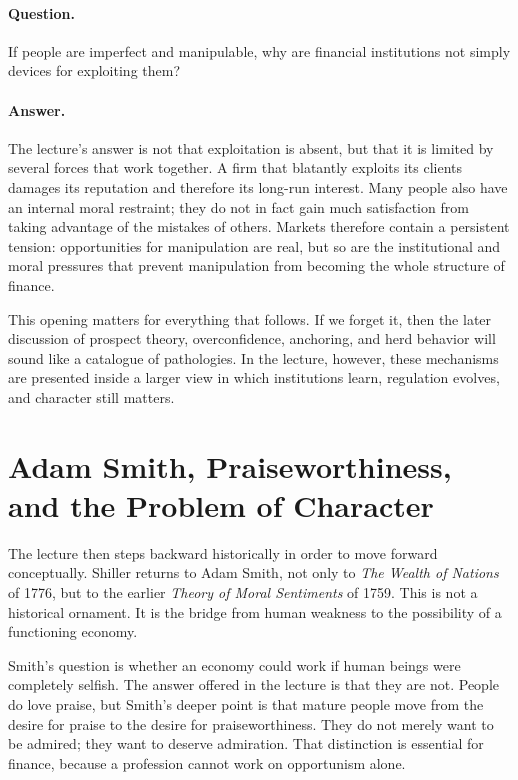 \paragraph{Question.} If people are imperfect and manipulable, why are financial institutions not simply devices for exploiting them?

\paragraph{Answer.} The lecture's answer is not that exploitation is absent, but that it is limited by several forces that work together. A firm that blatantly exploits its clients damages its reputation and therefore its long-run interest. Many people also have an internal moral restraint; they do not in fact gain much satisfaction from taking advantage of the mistakes of others. Markets therefore contain a persistent tension: opportunities for manipulation are real, but so are the institutional and moral pressures that prevent manipulation from becoming the whole structure of finance.

This opening matters for everything that follows. If we forget it, then the later discussion of prospect theory, overconfidence, anchoring, and herd behavior will sound like a catalogue of pathologies. In the lecture, however, these mechanisms are presented inside a larger view in which institutions learn, regulation evolves, and character still matters.

\section{Adam Smith, Praiseworthiness, and the Problem of Character}

The lecture then steps backward historically in order to move forward conceptually. Shiller returns to Adam Smith, not only to \emph{The Wealth of Nations} of 1776, but to the earlier \emph{Theory of Moral Sentiments} of 1759. This is not a historical ornament. It is the bridge from human weakness to the possibility of a functioning economy.

Smith's question is whether an economy could work if human beings were completely selfish. The answer offered in the lecture is that they are not. People do love praise, but Smith's deeper point is that mature people move from the desire for praise to the desire for praiseworthiness. They do not merely want to be admired; they want to deserve admiration. That distinction is essential for finance, because a profession cannot work on opportunism alone.

